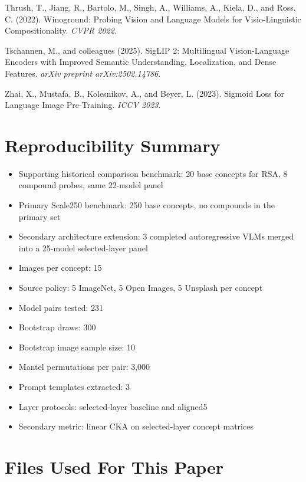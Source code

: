 \documentclass[10pt]{article}
\providecommand{\tightlist}{%
  \setlength{\itemsep}{0pt}\setlength{\parskip}{0pt}}
\begin{document}
Thrush, T., Jiang, R., Bartolo, M., Singh, A., Williams, A., Kiela, D.,
and Ross, C. (2022). Winoground: Probing Vision and Language Models for
Visio-Linguistic Compositionality. \emph{CVPR 2022}.

Tschannen, M., and colleagues (2025). SigLIP 2: Multilingual
Vision-Language Encoders with Improved Semantic Understanding,
Localization, and Dense Features. \emph{arXiv preprint
arXiv:2502.14786}.

Zhai, X., Mustafa, B., Kolesnikov, A., and Beyer, L. (2023). Sigmoid
Loss for Language Image Pre-Training. \emph{ICCV 2023}.

\appendix

\section{Reproducibility Summary}\label{reproducibility-summary}

\begin{itemize}
\tightlist
\item
  Supporting historical comparison benchmark: 20 base concepts for RSA,
  8 compound probes, same 22-model panel
\item
  Primary Scale250 benchmark: 250 base concepts, no compounds in the
  primary set
\item
  Secondary architecture extension: 3 completed autoregressive VLMs
  merged into a 25-model selected-layer panel
\item
  Images per concept: 15
\item
  Source policy: 5 ImageNet, 5 Open Images, 5 Unsplash per concept
\item
  Model pairs tested: 231
\item
  Bootstrap draws: 300
\item
  Bootstrap image sample size: 10
\item
  Mantel permutations per pair: 3,000
\item
  Prompt templates extracted: 3
\item
  Layer protocols: selected-layer baseline and aligned5
\item
  Secondary metric: linear CKA on selected-layer concept matrices
\end{itemize}

\section{Files Used For This Paper}\label{files-used-for-this-paper}
\end{document}
